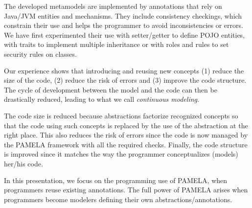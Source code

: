 
The developed metamodels are implemented by annotations that rely on Java/JVM entities and mechanisms. They include consistency checkings, which constrain their use and helps the programmer to avoid inconsistencies or errors. We have first experimented their use with setter/getter to define POJO entities, with traits to implement multiple inheritance or with roles and rules to set security rules on classes.

Our experience shows that introducing and reusing new concepts (1) reduce the size of the code, (2) reduce the risk of errors and (3) improve the code structure. The cycle of development between the model and the code can then be drastically reduced, leading to what we call \emph{continuous modeling}.

The code size is reduced because abstractions factorize recognized concepts so that the code using such concepts is replaced by the use of the abstraction at the right place. This also reduces the risk of errors since the code is now managed by the PAMELA framework with all the required checks. Finally, the code structure is improved since it matches the way the programmer conceptualizes (models) her/his code.


In this presentation, we focus on the programming use of PAMELA, when programmers reuse existing annotations. The full power of PAMELA arises when programmers become modelers defining their own abstractions/annotations.

